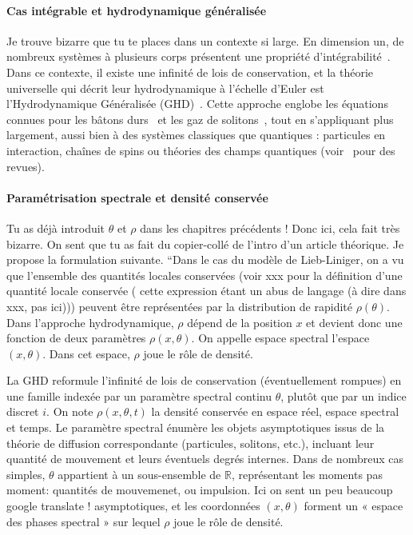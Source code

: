 \paragraph{Cas intégrable et hydrodynamique généralisée}
{\color{blue}Je trouve bizarre que tu te places dans un contexte si large.}
En dimension un, de nombreux systèmes à plusieurs corps présentent une propriété d’intégrabilité~\cite{ref2,ref3}. Dans ce contexte, il existe une infinité de lois de conservation, et la théorie universelle qui décrit leur hydrodynamique à l’échelle d’Euler est l’Hydrodynamique Généralisée (GHD)~\cite{ref4,ref5}. Cette approche englobe les équations connues pour les bâtons durs~\cite{ref1,ref6} et les gaz de solitons~\cite{ref7,ref8,ref9}, tout en s’appliquant plus largement, aussi bien à des systèmes classiques que quantiques : particules en interaction, chaînes de spins ou théories des champs quantiques (voir~\cite{ref10} pour des revues).

\paragraph{Paramétrisation spectrale et densité conservée}
          {\color{blue} Tu as déjà introduit $\theta$ et $\rho$ dans les chapitres précédents ! Donc ici, cela fait très bizarre. On sent que tu as fait du copier-collé de l'intro d'un article théorique. Je propose la formulation suivante.
 ``Dans le cas du modèle de Lieb-Liniger, on a vu que l'ensemble
            des quantités locales conservées (voir xxx pour la définition d'une quantité locale conservée ( cette expression étant un abus de langage (à dire dans xxx, pas ici))) peuvent être représentées par la distribution de rapidité $\rho(\theta)$. Dans l'approche hydrodynamique, $\rho$ dépend de la position $x$ et devient donc une fonction de deux paramètres  $\rho(x,\theta)$. On appelle espace spectral l'espace $(x,\theta)$. Dans cet espace, $\rho$ joue le rôle de densité.      }      

          La GHD reformule l’infinité de lois de conservation (éventuellement rompues) en une famille indexée par un paramètre spectral continu $\theta$, plutôt que par un indice discret $i$. On note $\rho(x,\theta,t)$ la densité conservée en espace réel, espace spectral et temps. Le paramètre spectral énumère les objets asymptotiques issus de la théorie de diffusion correspondante (particules, solitons, etc.), incluant leur quantité de mouvement et leurs éventuels degrés internes. Dans de nombreux cas simples, $\theta$ appartient à un sous-ensemble de $\mathbb{R}$, représentant les moments {\color{blue} pas moment: quantités de mouvemenet, ou impulsion. Ici on sent un peu beaucoup google translate !} asymptotiques, et les coordonnées $(x,\theta)$ forment un « espace des phases spectral » sur lequel $\rho$ joue le rôle de densité.


